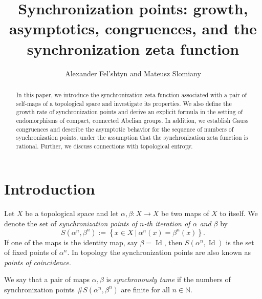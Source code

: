 \documentclass[oneside]{amsart}
\title[Synchronization zeta function]{Synchronization points: growth, asymptotics, congruences, and the synchronization zeta function}
\author{Alexander Fel'shtyn and Mateusz Slomiany}
\def\N{\mathbb{N}}
\def\Id{\operatorname{Id}}
\begin{document}
\begin{abstract}
In this paper, we introduce the synchronization zeta function associated with a pair of self-maps
of a topological space and investigate its properties.
We also define   the growth rate of synchronization points and derive an explicit formula
in the setting of endomorphisms of compact, connected Abelian groups.
In addition, we establish Gauss congruences and describe the asymptotic behavior for the sequence
of numbers of synchronization points, under the assumption that the synchronization zeta function is rational.
Further, we  discuss connections with topological entropy.
\end{abstract}
\maketitle

\setcounter{tocdepth}{1}
\tableofcontents







\vspace{1cm}
\bigskip
\section{Introduction}

Let $X$ be a topological space and let $\alpha, \beta: X \to X$ be two maps of $X$ to itself.
We denote the set of \emph{synchronization points of $n$-th iteration of $\alpha$ and $\beta$} by
\begin{equation*} %
  S(\alpha^n, \beta^n) := \left\{ x \in X \ \vert \ \alpha^n(x) = \beta^n(x) \right\}.
\end{equation*}
If one of the maps is the identity map, say $\beta = \Id$, then $S(\alpha^n, \Id)$ is the set of
fixed points of $\alpha^n$.
In topology the synchronization points are also known as \emph{points of coincidence}.

We say that a pair of maps $\alpha, \beta$ is \emph{synchronously tame} if
the numbers of synchronization points $\# S(\alpha^n, \beta^n) $  are finite for all $n \in \N$.
\end{document}
